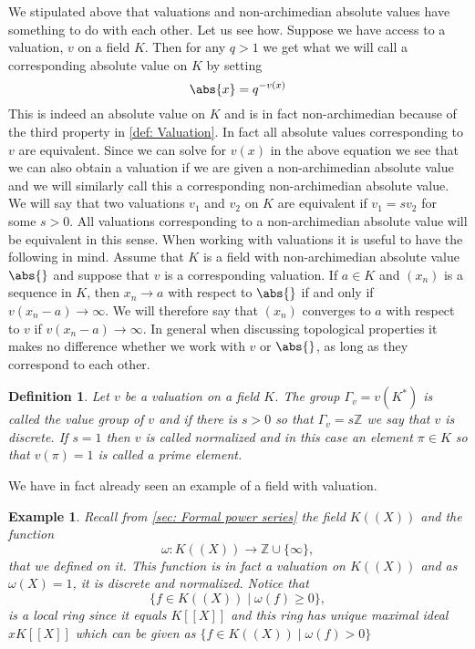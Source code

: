 \documentclass{article}
\newtheorem{definition}{Definition}[section]
\newtheorem{example}{Example}[section]
\newcommand{\mbb}[1]{\mathbb{#1}}
\numberwithin{equation}{section}
\begin{document}
We stipulated above that valuations and non-archimedian absolute values have something to do with each other. Let us see how. Suppose we have access to a valuation, $v$ on a field $K$. Then for any $q > 1$ we get what we will call a corresponding absolute value on $K$ by setting
$$\abs{x} = q^{-v(x)}$$
This is indeed an absolute value on $K$ and is in fact non-archimedian because of the third property in \cref{def: Valuation}. In fact all absolute values corresponding to $v$ are equivalent. Since we can solve for $v(x)$ in the above equation we see that we can also obtain a valuation if we are given a non-archimedian absolute value and we will similarly call this a corresponding non-archimedian absolute value. We will say that two valuations $v_1$ and $v_2$ on $K$ are equivalent if $v_1 = sv_2$ for some $s > 0$. All valuations corresponding to a non-archimedian absolute value will be equivalent in this sense. When working with valuations it is useful to have the following in mind. Assume that $K$ is a field with non-archimedian absolute value $\abs{}$ and suppose that $v$ is a corresponding valuation. If $a \in K$ and $(x_n)$ is a sequence in $K$, then $x_n \to a$ with respect to $\abs{}$ if and only if $v(x_n - a) \to \infty$. We will therefore say that $(x_n)$ converges to $a$ with respect to $v$ if $v(x_n - a) \to \infty$. In general when discussing topological properties it makes no difference whether we work with $v$ or $\abs{}$, as long as they correspond to each other. 

\begin{definition}
	Let $v$ be a valuation on a field $K$. The group $\Gamma_v = v(K^*)$ is called the value group of $v$ and if there is $s > 0$ so that $\Gamma_v = s\mbb Z$ we say that $v$ is discrete. If $s = 1$ then $v$ is called normalized and in this case an element $\pi \in K$ so that $v(\pi) = 1$ is called a prime element.
   
\end{definition}

We have in fact already seen an example of a field with valuation.
\begin{example}\label{ex: K((x)) is valued field}
	Recall from \cref{sec: Formal power series} the field $K((X))$ and the function $$\omega : K((X)) \to \mbb Z \cup \{ \infty \},$$ that we defined on it. This function is in fact a valuation on $K((X))$ and as $\omega(X) = 1$,
	it is discrete and normalized. Notice that
	$$\{f \in K((X)) \mid \omega(f) \geq 0 \},$$
	is a local ring since it equals $K[[X]]$ and this ring has unique maximal ideal $x K[[X]]$ which can be given as
	$\{ f \in K((X)) \mid \omega(f) > 0\}$
\end{example}
\end{document}
